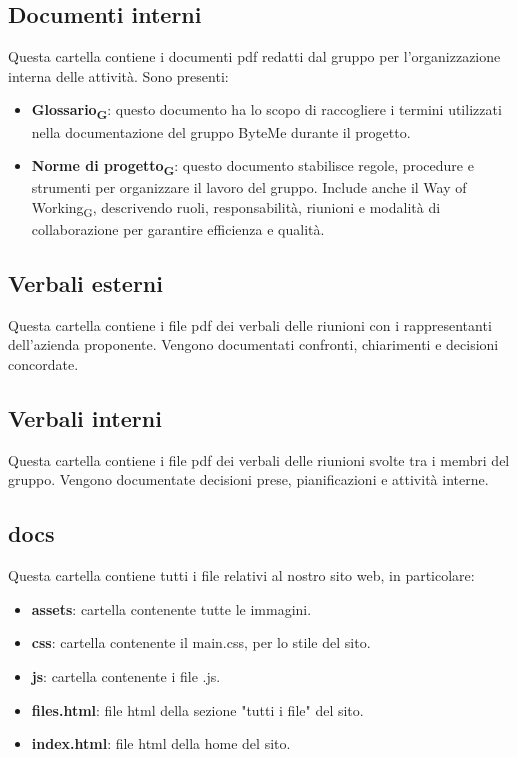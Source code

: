 \documentclass[11pt,a4paper]{article}
\newcommand{\gls}[1]{#1\textsubscript{G}}
\begin{document}
\subsection{Documenti interni}
Questa cartella contiene i documenti pdf redatti dal gruppo per l’organizzazione interna delle attività. Sono presenti:
\begin{itemize}
\item \textbf{\gls{Glossario}}: questo documento ha lo scopo di raccogliere i termini utilizzati nella documentazione del gruppo ByteMe durante il progetto.
\item \textbf{\gls{Norme di progetto}}: questo documento stabilisce regole, procedure e strumenti per organizzare il lavoro del gruppo. Include anche il \gls{Way of Working}, descrivendo ruoli, responsabilità, riunioni e modalità di collaborazione per garantire efficienza e qualità.
\end{itemize}

\subsection{Verbali esterni}
Questa cartella contiene i file pdf dei verbali delle riunioni con i rappresentanti dell'azienda proponente. Vengono documentati confronti, chiarimenti e decisioni concordate.

\subsection{Verbali interni}
Questa cartella contiene i file pdf dei verbali delle riunioni svolte tra i membri del gruppo. Vengono documentate decisioni prese, pianificazioni e attività interne.

\subsection{docs}
Questa cartella contiene tutti i file relativi al nostro sito web, in particolare:
\begin{itemize}
\item \textbf{assets}: cartella contenente tutte le immagini.
\item \textbf{css}: cartella contenente il main.css, per lo stile del sito.
\item \textbf{js}: cartella contenente i file .js.
\item \textbf{files.html}: file html della sezione "tutti i file" del sito.
\item \textbf{index.html}: file html della home del sito.
\end{itemize}
\end{document}

